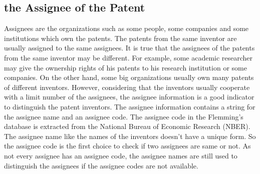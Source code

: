 

\subsection{the Assignee of the Patent}
Assignees are the organizations such as some people, some companies and some institutions which own the patents. The patents from the same inventor are usually assigned to the same assignees. It is true that the assignees of the patents from the same inventor may be different. For example, some academic researcher may give the ownership rights of his patents to his research institution or some companies. On the other hand, some big organizations usually own many patents of different inventors. However, considering that the inventors usually cooperate with a limit number of the assignees, the assignee information is a good indicator to distinguish the patent inventors. The assignee information contains a string for the assignee name and an assignee code. The assignee code in the Flemming's database is extracted from the National Bureau of Economic Research (NBER). The assignee name like the names of the inventors doesn't have a unique form. So the assignee code is the first choice to check if two assignees are same or not. As not every assignee has an assignee code, the assignee names are still used to distinguish the assignees if the assignee codes are not available.  


